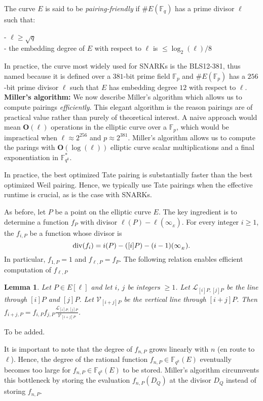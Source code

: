 \documentclass[11pt, lettersize, notitlepage, leqno, footskip=0.6cm]{article}
\newcommand{\bFp}{\mathbb{F}_p}
\newcommand{\bFq}{\mathbb{F}_q}
\newcommand{\bFqk}{\mathbb{F}_{q^k}}
\newcommand{\divv}{\mathrm{div}}
\newcommand{\mc}{\mathcal}
\newcommand{\mbf}{\mathbf}
\newcommand{\bO}{\mbf{O}}
\newcommand{\vs}{\vspace{-2mm}}
\newcommand{\noin}{\noindent}
\newtheorem{Lem}[Thm]{Lemma}
\numberwithin{equation}{section}
\begin{document}
The curve $E$ is said to be \textit{pairing-friendly} if $\# E(\bFq)$ has a prime divisor $\ell$ such that:

\noin - $\ell\geq \sqrt{q}$\\
- the embedding degree of $E$ with respect to $\ell$ is  $\leq \log_2(\ell)/8$

In practice, the curve most widely used for SNARKs is the BLS12-381, thus named because it is defined over a $381$-bit prime field $\bFp$ and $\# E(\bFp)$ has a $256$-bit prime divisor $\ell$ such that $E$ has embedding degree $12$ with respect to $\ell$.\\ 




\noin \textbf{Miller's algorithm:} We now describe Miller's algorithm which allows us to compute pairings \textit{efficiently}. This elegant algorithm is the reason pairings are of practical value rather than purely of theoretical interest. A naive approach would mean $\bO(\ell)$ operations in the elliptic curve over a $\bFp$, which would be impractical when $\ell \approx 2^{256}$ and $p\approx 2^{381}$. Miller's algorithm allows us to compute the parings with $\bO(\log(\ell))$  elliptic curve scalar multiplications and a final exponentiation in $\bFqk^*$.

In practice, the best optimized Tate pairing is substantially faster than the best optimized Weil pairing. Hence, we typically use Tate pairings when the     effective runtime is crucial, as is the case with SNARKs.

As before, let $P$ be a point on the elliptic curve $E$. The key ingredient is to determine a function $f_{P}$ with divisor $\ell(P)-\ell(\infty_{_E})$. For every integer $i\geq 1$, the $f_{i,P}$ be a function whose divisor is \vs $$\divv(f_i) = i(P)	- ([i]P) - (i-1)(\infty_{_E}).\vs $$ In particular, $f_{1,P} = 1$ and $f_{\ell,P} = f_{P}$. The following relation enables efficient computation of $f_{\ell,P}$


\begin{Lem} Let $P\in E[\ell]$ and let $i$, $j$ be integers $\geq 1$. Let $\mc{L}_{[i]P, [j]P}$ be the line through $[i]P$ and $[j]P$. Let $\mc{V}_{[i+j]P}$ be the vertical line through $[i+j]P$. Then $f_{i+j,P} = f_{i,P}f_{j,P}\frac{\mc{L}_{[i]P, [j]P}}{\mc{V}_{[i+j]P}}$.\end{Lem}

\begin{prf} To be added.  \end{prf}

It is important to note that the degree of $f_{n,P}$ grows linearly with $n$ (en route to $\ell$). Hence, the degree of the rational function $f_{n,P}\in \bFqk(E)$ eventually becomes too large for $f_{n,P}\in \bFqk(E)$ to be stored. Miller's algorithm circumvents this bottleneck by storing the evaluation $f_{n,P}(D_Q)$ at the divisor $D_Q$ instead of storing $f_{n,P}$. 
\end{document}
